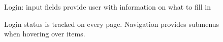 \begin{multicols}{2}

\begin{figure}[H]
%
\caption{Login: input fields provide user with information on what to fill in}%
\end{figure}

\begin{figure}[H]
%
\caption{Login status is tracked on every page. Navigation provides submenus when hovering over items.}%
\end{figure}

\end{multicols}
